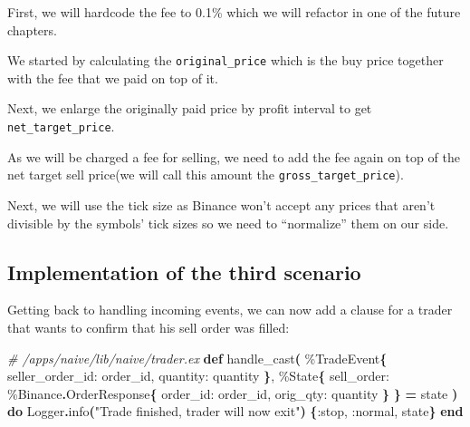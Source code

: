 \documentclass[
  oneside]{book}
\newenvironment{Shaded}{\begin{snugshade}}{\end{snugshade}}
\newcommand{\CommentTok}[1]{\textcolor[rgb]{0.56,0.35,0.01}{\textit{#1}}}
\newcommand{\ConstantTok}[1]{\textcolor[rgb]{0.56,0.35,0.01}{#1}}
\newcommand{\FunctionTok}[1]{\textcolor[rgb]{0.13,0.29,0.53}{\textbf{#1}}}
\newcommand{\KeywordTok}[1]{\textcolor[rgb]{0.13,0.29,0.53}{\textbf{#1}}}
\newcommand{\NormalTok}[1]{#1}
\newcommand{\OperatorTok}[1]{\textcolor[rgb]{0.81,0.36,0.00}{\textbf{#1}}}
\newcommand{\StringTok}[1]{\textcolor[rgb]{0.31,0.60,0.02}{#1}}
\newcommand{\VariableTok}[1]{\textcolor[rgb]{0.00,0.00,0.00}{#1}}
\begin{document}
First, we will hardcode the fee to 0.1\% which we will refactor in one of the future chapters.

We started by calculating the \texttt{original\_price} which is the buy price together with the fee that we paid on top of it.

Next, we enlarge the originally paid price by profit interval to get \texttt{net\_target\_price}.

As we will be charged a fee for selling, we need to add the fee again on top of the net target sell price(we will call this amount the \texttt{gross\_target\_price}).

Next, we will use the tick size as Binance won't accept any prices that aren't divisible by the symbols' tick sizes so we need to ``normalize'' them on our side.

\subsection{Implementation of the third scenario}\label{implementation-of-the-third-scenario}

Getting back to handling incoming events, we can now add a clause for a trader that wants to confirm that his sell order was filled:

\begin{Shaded}
\begin{Highlighting}[]
  \CommentTok{\# /apps/naive/lib/naive/trader.ex}
  \KeywordTok{def}\NormalTok{ handle\_cast}\FunctionTok{(}
\NormalTok{        \%}\ConstantTok{TradeEvent}\FunctionTok{\{}
          \VariableTok{seller\_order\_id:}\NormalTok{ order\_id,}
          \VariableTok{quantity:}\NormalTok{ quantity}
        \FunctionTok{\}}\NormalTok{,}
\NormalTok{        \%}\ConstantTok{State}\FunctionTok{\{}
          \VariableTok{sell\_order:}\NormalTok{ \%}\ConstantTok{Binance}\OperatorTok{.}\ConstantTok{OrderResponse}\FunctionTok{\{}
            \VariableTok{order\_id:}\NormalTok{ order\_id,}
            \VariableTok{orig\_qty:}\NormalTok{ quantity}
          \FunctionTok{\}}
        \FunctionTok{\}} \OperatorTok{=}\NormalTok{ state}
      \FunctionTok{)} \KeywordTok{do}
    \ConstantTok{Logger}\OperatorTok{.}\NormalTok{info}\FunctionTok{(}\StringTok{"Trade finished, trader will now exit"}\FunctionTok{)}
    \FunctionTok{\{}\VariableTok{:stop}\NormalTok{, }\VariableTok{:normal}\NormalTok{, state}\FunctionTok{\}}
  \KeywordTok{end}
\end{Highlighting}
\end{Shaded}
\end{document}
